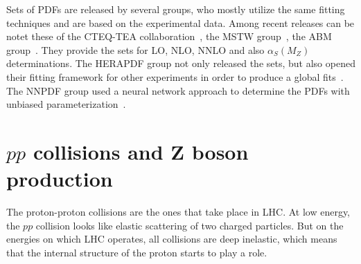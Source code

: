 Sets of PDFs are released by several groups, who mostly utilize the same fitting techniques and are based on the experimental data. Among recent releases can be notet these of the CTEQ-TEA collaboration~\cite{lib:MC_pdfct10}, the MSTW group~\cite{lib:MC_pdfmstw1, lib:MC_pdfmstw2}, the ABM group~\cite{lib:MC_pdfabm}. They provide the sets for LO, NLO, NNLO and also $\alpha_{S}(M_{Z})$ determinations. The HERAPDF group not only released the sets, but also opened their fitting framework for other experiments in order to produce a global fits~\cite{lib:MC_pdfhera}. The NNPDF group used a neural network approach to determine the PDFs with unbiased parameterization~\cite{lib:MC_nnpdf1,lib:MC_nnpdf2,lib:MC_nnpdf3}.

\section{$pp$ collisions and Z boson production}

The proton-proton collisions are the ones that take place in LHC. At low energy, the $pp$ collision looks like elastic scattering of two charged particles. But on the energies on which LHC operates, all collisions are deep inelastic, which means that the internal structure of the proton starts to play a role.

\begin{figure}
\end{figure}

